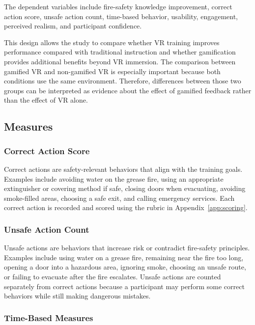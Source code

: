 \documentclass[manuscript, review]{acmart}
\begin{document}
{The dependent variables include fire-safety knowledge improvement, correct action score, unsafe action count, time-based behavior, usability, engagement, perceived realism, and participant confidence.

This design allows the study to compare whether VR training improves performance compared with traditional instruction and whether gamification provides additional benefits beyond VR immersion. The comparison between gamified VR and non-gamified VR is especially important because both conditions use the same environment. Therefore, differences between those two groups can be interpreted as evidence about the effect of gamified feedback rather than the effect of VR alone.

\subsection{Measures}

\subsubsection{Correct Action Score}

Correct actions are safety-relevant behaviors that align with the training goals. Examples include avoiding water on the grease fire, using an appropriate extinguisher or covering method if safe, closing doors when evacuating, avoiding smoke-filled areas, choosing a safe exit, and calling emergency services. Each correct action is recorded and scored using the rubric in Appendix~\ref{app:scoring}.

\subsubsection{Unsafe Action Count}

Unsafe actions are behaviors that increase risk or contradict fire-safety principles. Examples include using water on a grease fire, remaining near the fire too long, opening a door into a hazardous area, ignoring smoke, choosing an unsafe route, or failing to evacuate after the fire escalates. Unsafe actions are counted separately from correct actions because a participant may perform some correct behaviors while still making dangerous mistakes.

\subsubsection{Time-Based Measures}

}
\end{document}

